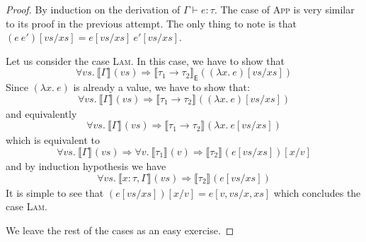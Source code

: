 \documentclass{article}
\newcommand{\EXP}{\mathsf{E}}
\newcommand{\semtyp}[2]{\llbracket #2 \rrbracket_{#1}}
\begin{document}
\begin{proof}
By induction on the derivation of $\Gamma \vdash e : \tau$.
The case of \textsc{App} is very similar to its proof in the previous attempt.
The only thing to note is that $(e~e')[\mathit{vs}/\mathit{xs}] = e[\mathit{vs}/\mathit{xs}]~e'[\mathit{vs}/\mathit{xs}]$.

Let us consider the case \textsc{Lam}. In this case, we have to show that
\[
\forall \mathit{vs}. ~\semtyp{}{\Gamma}(\mathit{vs}) \Rightarrow
\semtyp{\EXP}{\tau_1 \to \tau_2}((\lambda x.~e)[\mathit{vs}/\mathit{xs}])
\]
Since $(\lambda x.~e)$ is already a value, we have to show that:
\[
\forall \mathit{vs}. ~\semtyp{}{\Gamma}(\mathit{vs}) \Rightarrow
\semtyp{}{\tau_1 \to \tau_2}((\lambda x.~e)[\mathit{vs}/\mathit{xs}])
\]
and equivalently
\[
\forall \mathit{vs}. ~\semtyp{}{\Gamma}(\mathit{vs}) \Rightarrow
\semtyp{}{\tau_1 \to \tau_2}(\lambda x.~e[\mathit{vs}/\mathit{xs}])
\]
which is equivalent to 
\[
\forall \mathit{vs}. ~\semtyp{}{\Gamma}(\mathit{vs}) \Rightarrow
\forall v.~\semtyp{}{\tau_1}(v) \Rightarrow \semtyp{}{\tau_2}(e[\mathit{vs}/\mathit{xs}])[x/v]
\]
and by induction hypothesis we have
\[
\forall \mathit{vs}. ~\semtyp{}{x : \tau, \Gamma}(\mathit{vs}) \Rightarrow
\semtyp{}{\tau_2}(e[\mathit{vs}/\mathit{xs}])
\]
It is simple to see that $(e[\mathit{vs}/\mathit{xs}])[x/v] = e[v, \mathit{vs}/x, \mathit{xs}]$
which concludes the case \textsc{Lam}.

We leave the rest of the cases as an easy exercise.
\end{proof}
\end{document}
